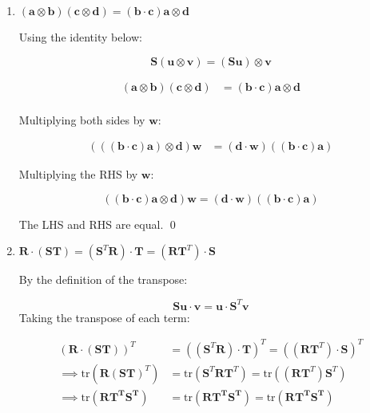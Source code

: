 \begin{problem}
\begin{enumerate}
        
        The LHS and RHS are equal. \qed
        \pagebreak
        \item $(\mathbf{a}\otimes \mathbf{b})(\mathbf{c}\otimes \mathbf{d})=(\mathbf{b}\cdot \mathbf{c})\mathbf{a}\otimes \mathbf{d}$
        
        Using the identity below:

$$
\mathbf{S}(\mathbf{u\otimes v})=(\mathbf{Su})\otimes \mathbf{v}
$$


\begin{align*}
(\mathbf{a}\otimes \mathbf{b})(\mathbf{c}\otimes \mathbf{d})&=(\mathbf{b}\cdot \mathbf{c})\mathbf{a}\otimes \mathbf{d}\\[10pt]
\end{align*}

Multiplying both sides by $\mathbf{w}$:


\begin{align*}
(((\mathbf{b}\cdot \mathbf{c})\mathbf{a})\otimes \mathbf{d})\mathbf{w}&=(\mathbf{d}\cdot \mathbf{w})((\mathbf{b}\cdot \mathbf{c})\mathbf{a})
\end{align*}

Multiplying the RHS by $\mathbf{w}$:

$$
((\mathbf{b}\cdot \mathbf{c})\mathbf{a}\otimes \mathbf{d})\mathbf{w}=(\mathbf{d}\cdot \mathbf{w})((\mathbf{b}\cdot \mathbf{c})\mathbf{a})
$$

The LHS and RHS are equal. \qed
\vspace*{1cm}
        \item $\mathbf{R}\cdot(\mathbf{S}\mathbf{T})=(\mathbf{S}^T\mathbf{R})\cdot \mathbf{T}=(\mathbf{R}\mathbf{T}^T)\cdot \mathbf{S}$
        
        By the definition of the transpose:

$$
\mathbf{S}\mathbf{u}\cdot \mathbf{v}=\mathbf{u}\cdot \mathbf{S}^T\mathbf{v}
$$
Taking the transpose of each term:


\begin{align*}
(\mathbf{R}\cdot(\mathbf{S}\mathbf{T}))^T&=((\mathbf{S}^T\mathbf{R})\cdot \mathbf{T})^T=((\mathbf{R}\mathbf{T}^T)\cdot \mathbf{S})^T\\[10pt]
\implies \text{tr}(\mathbf{R}(\mathbf{S}\mathbf{T})^T)&=\text{tr}(\mathbf{S}^T\mathbf{R}\mathbf{T}^T)=\text{tr}((\mathbf{R}\mathbf{T}^T)\mathbf{S}^T)\\[10pt]\implies
\text{tr}(\mathbf{R}\mathbf{T^T}\mathbf{S^T})&=\text{tr}(\mathbf{R}\mathbf{T^T}\mathbf{S^T})=\text{tr}(\mathbf{R}\mathbf{T^T}\mathbf{S^T})\tag{1}
\end{align*}



\end{enumerate}
\end{problem}
